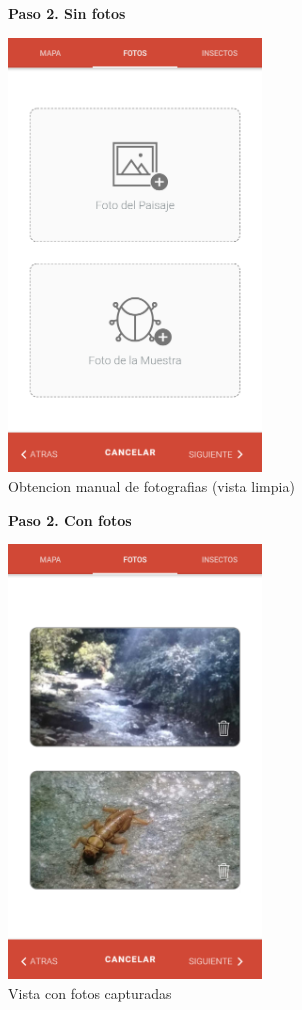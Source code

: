 				\begin{figure}[H]
					\centering
					\textbf{Paso 2. Sin fotos}\par\medskip
					\includegraphics[width=0.6\textwidth]{Screenshots/registroPaso2A.png}
					\caption{Obtencion manual de fotografias (vista limpia)}
				\end{figure}
				
				\begin{figure}[H]
					\centering
					\textbf{Paso 2. Con fotos}\par\medskip
					\includegraphics[width=0.6\textwidth]{Screenshots/registroPaso2B.png}
					\caption{Vista con fotos capturadas}
				\end{figure}
				
